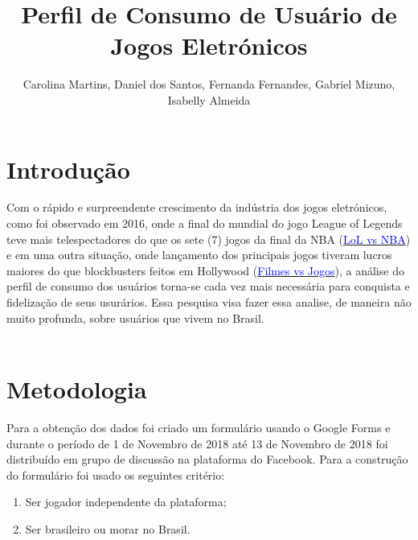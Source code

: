 \documentclass[11pt,a4paper]{article}
\title{Perfil de Consumo de Usuário de Jogos Eletrónicos}
\author{Carolina Martins, Daniel dos Santos, Fernanda Fernandes, Gabriel Mizuno, Isabelly  Almeida}
\date{ }
\begin{document}
 
\maketitle
 
\tableofcontents

\newpage
\section{Introdução}

Com o rápido e surpreendente crescimento da indústria dos jogos eletrónicos, como foi observado em 2016, onde a final do mundial do jogo League of Legends teve mais telespectadores do que os sete (7) jogos da final da NBA (\href{https://bit.ly/2Dvdtw9}{\textcolor{blue}{LoL vs NBA}}) e em uma outra situação, onde lançamento dos principais jogos tiveram lucros maiores do que blockbusters feitos em Hollywood  (\href{https://bit.ly/2FfWHTk}{\textcolor{blue}{Filmes vs Jogos}}), a análise do perfil de consumo dos usuários torna-se cada vez mais necessária para conquista e fidelização de seus usurários. Essa pesquisa visa fazer essa analise, de maneira não muito profunda, sobre usuários que vivem no Brasil. 
\\ 
\\
 
\section{Metodologia}

Para a obtenção dos dados foi criado um formulário usando o Google Forms  e durante o período de 1 de Novembro de 2018 até 13 de Novembro de 2018 foi distribuído em grupo de discussão na plataforma do Facebook. Para a construção do formulário foi usado os seguintes critério:

\begin{enumerate}[label=(\roman*)]
\item Ser jogador independente da plataforma;
\item Ser brasileiro ou morar no Brasil.
\end{enumerate}
\end{document}
